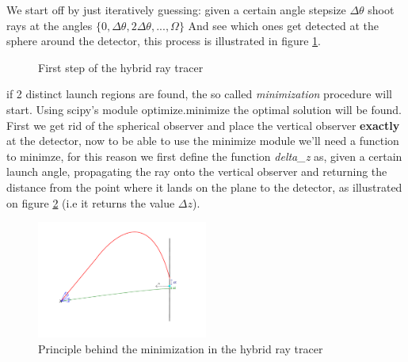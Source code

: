 \documentclass[11pt,a4paper,faculty=we,language=en,doctype=report]{cls/ugent-doc}
\begin{document}
We start off by just iteratively guessing: given a certain angle stepsize
$\Delta \theta$ shoot rays at the angles $\{0,\Delta \theta, 2\Delta
\theta,...,\Omega\}$ And see which ones get detected at the sphere around the
detector, this process is illustrated in figure \ref{figure:First step hybrid}.
\begin{figure}
	\centering
	\caption{First step of the hybrid ray tracer}
	\label{figure:First step hybrid}
\end{figure}
if 2 distinct launch regions are found, the so called \textit{minimization}
procedure will start. Using scipy's module optimize.minimize the optimal
solution will be found. First we get rid of the spherical observer and place
the vertical observer \textbf{exactly} at the detector, now to be able to use the
minimize module we'll need a function to minimze, for this reason we first define the
function \textit{delta\_z} as, given a certain launch angle, propagating the ray
onto the vertical observer and returning the
distance from the point where it lands on the plane to the detector, as
illustrated on figure \ref{fig:PrincipleHybridIllu} (i.e it returns the value $\Delta z$).
\begin{figure}
  \centering
  \includegraphics[width=0.5\textwidth]{PrincipleHybridIllu.pdf}
  \caption{Principle behind the minimization in the hybrid ray tracer}
  \label{fig:PrincipleHybridIllu}
\end{figure}
\end{document}
